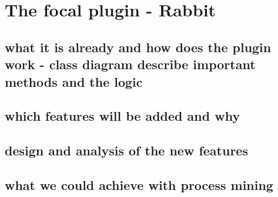 \chapter{The focal plugin - Rabbit}\label{sec:the operating system}
\section{what it is already and how does the plugin work - class diagram describe important methods and the logic}
\section{which features will be added and why}
\section{design and analysis of the new features}
\section{what we could achieve with process mining}
